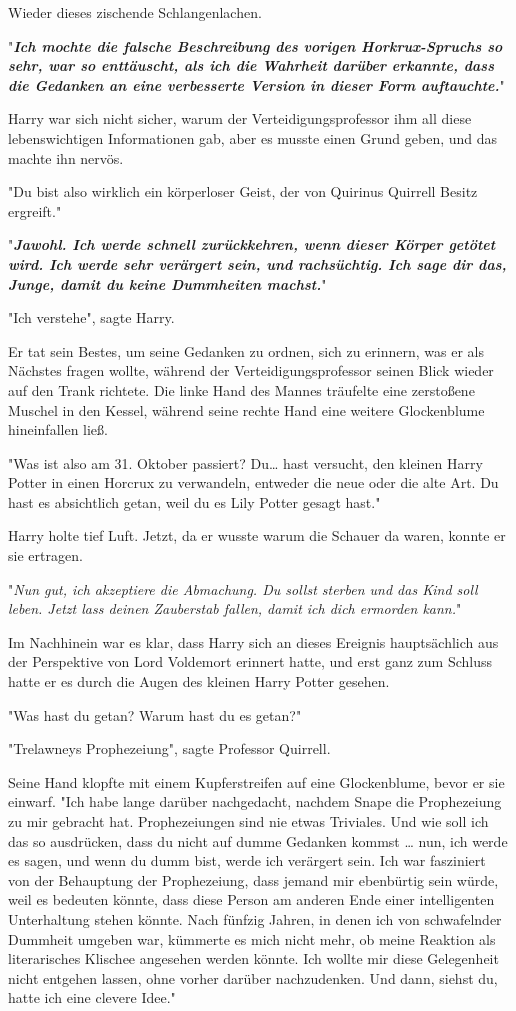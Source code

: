 {Wieder dieses zischende Schlangenlachen.

"\textbf{\emph{Ich mochte die falsche Beschreibung des vorigen Horkrux-Spruchs so sehr, war so enttäuscht, als ich die Wahrheit darüber erkannte, dass die Gedanken an eine verbesserte Version in dieser Form auftauchte.}}"

Harry war sich nicht sicher, warum der Verteidigungsprofessor ihm all diese lebenswichtigen Informationen gab, aber es musste einen Grund geben, und das machte ihn nervös.

"Du bist also wirklich ein körperloser Geist, der von Quirinus Quirrell Besitz ergreift."

"\textbf{\emph{Jawohl. Ich werde schnell zurückkehren, wenn dieser Körper getötet wird. Ich werde sehr verärgert sein, und rachsüchtig. Ich sage dir das, Junge, damit du keine Dummheiten machst.}}"

"Ich verstehe", sagte Harry.

Er tat sein Bestes, um seine Gedanken zu ordnen, sich zu erinnern, was er als Nächstes fragen wollte, während der Verteidigungsprofessor seinen Blick wieder auf den Trank richtete. Die linke Hand des Mannes träufelte eine zerstoßene Muschel in den Kessel, während seine rechte Hand eine weitere Glockenblume hineinfallen ließ.

"Was ist also am 31. Oktober passiert? Du… hast versucht, den kleinen Harry Potter in einen Horcrux zu verwandeln, entweder die neue oder die alte Art. Du hast es absichtlich getan, weil du es Lily Potter gesagt hast."

Harry holte tief Luft. Jetzt, da er wusste warum die Schauer da waren, konnte er sie ertragen.

"\emph{Nun gut, ich akzeptiere die Abmachung. Du sollst sterben und das Kind soll leben. Jetzt lass deinen Zauberstab fallen, damit ich dich ermorden kann.}"

Im Nachhinein war es klar, dass Harry sich an dieses Ereignis hauptsächlich aus der Perspektive von Lord Voldemort erinnert hatte, und erst ganz zum Schluss hatte er es durch die Augen des kleinen Harry Potter gesehen.

"Was hast du getan? Warum hast du es getan?"

"Trelawneys Prophezeiung", sagte Professor Quirrell.

Seine Hand klopfte mit einem Kupferstreifen auf eine Glockenblume, bevor er sie einwarf. "Ich habe lange darüber nachgedacht, nachdem Snape die Prophezeiung zu mir gebracht hat. Prophezeiungen sind nie etwas Triviales. Und wie soll ich das so ausdrücken, dass du nicht auf dumme Gedanken kommst … nun, ich werde es sagen, und wenn du dumm bist, werde ich verärgert sein. Ich war fasziniert von der Behauptung der Prophezeiung, dass jemand mir ebenbürtig sein würde, weil es bedeuten könnte, dass diese Person am anderen Ende einer intelligenten Unterhaltung stehen könnte. Nach fünfzig Jahren, in denen ich von schwafelnder Dummheit umgeben war, kümmerte es mich nicht mehr, ob meine Reaktion als literarisches Klischee angesehen werden könnte. Ich wollte mir diese Gelegenheit nicht entgehen lassen, ohne vorher darüber nachzudenken. Und dann, siehst du, hatte ich eine clevere Idee."

}
